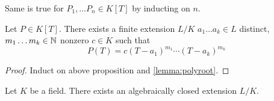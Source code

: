 \begin{rmk}
    Same is true for $P_1, \dots P_n \in K[T]$ by inducting on $n$.
\end{rmk}

\begin{cor}
    Let $P \in K[T]$. There exists a finite extension $L / K$ $a_1 \dots a_k \in L$
    distinct, $m_1 \dots m_k \in \mathbb{N}$ nonzero $c \in K$ such that
    $$
    P(T) = c(T - a_1)^{m_1} \cdots (T - a_k)^{m_k}
    $$
\end{cor}
\begin{proof}
    Induct on above proposition and \ref{lemma:polyroot}.
\end{proof}

\begin{thm}\label{thm:algextension}
    Let $K$ be a field. There exists an algebraically closed extension $L / K$.
\end{thm}

